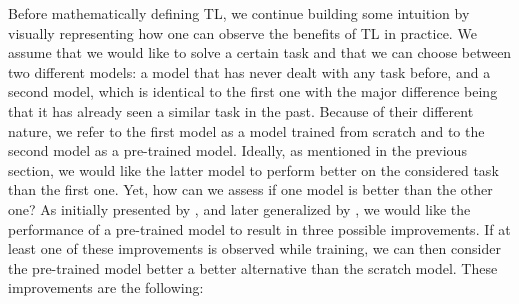 Before mathematically defining TL, we continue building some intuition by visually representing how one can observe the benefits of TL in practice. We assume that we would like to solve a certain task and that we can choose between two different models: a model that has never dealt with any task before, and a second model, which is identical to the first one with the major difference being that it has already seen a similar task in the past. Because of their different nature, we refer to the first model as a model trained from scratch and to the second model as a pre-trained model. Ideally, as mentioned in the previous section, we would like the latter model to perform better on the considered task than the first one. Yet, how can we assess if one model is better than the other one? As initially presented by \citet{langley2006transfer}, and later generalized by \citet{lazaric2012transfer}, we would like the performance of a pre-trained model to result in three possible improvements. If at least one of these improvements is observed while training, we can then consider the pre-trained model better a better alternative than the scratch model. These improvements are the following:
